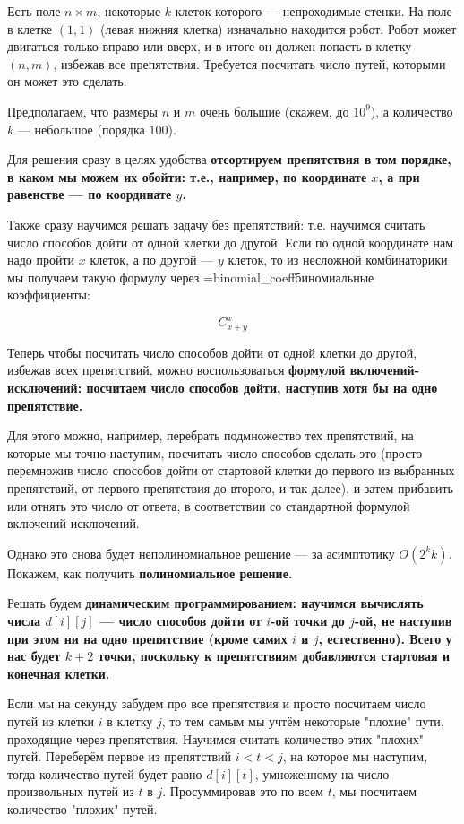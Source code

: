 Есть поле $n \times m$, некоторые $k$ клеток которого --- непроходимые стенки. На поле в клетке $(1,1)$ (левая нижняя клетка) изначально находится робот. Робот может двигаться только вправо или вверх, и в итоге он должен попасть в клетку $(n,m)$, избежав все препятствия. Требуется посчитать число путей, которыми он может это сделать.

Предполагаем, что размеры $n$ и $m$ очень большие (скажем, до $10^9$), а количество $k$ --- небольшое (порядка $100$).

Для решения сразу в целях удобства \bf{отсортируем} препятствия в том порядке, в каком мы можем их обойти: т.е., например, по координате $x$, а при равенстве --- по координате $y$.

Также сразу научимся решать задачу без препятствий: т.е. научимся считать число способов дойти от одной клетки до другой. Если по одной координате нам надо пройти $x$ клеток, а по другой --- $y$ клеток, то из несложной комбинаторики мы получаем такую формулу через \algohref=binomial_coeff{биномиальные коэффициенты}:

$$ C_{x+y}^{x} $$

Теперь чтобы посчитать число способов дойти от одной клетки до другой, избежав всех препятствий, можно воспользоваться \bf{формулой включений-исключений}: посчитаем число способов дойти, наступив хотя бы на одно препятствие.

Для этого можно, например, перебрать подмножество тех препятствий, на которые мы точно наступим, посчитать число способов сделать это (просто перемножив число способов дойти от стартовой клетки до первого из выбранных препятствий, от первого препятствия до второго, и так далее), и затем прибавить или отнять это число от ответа, в соответствии со стандартной формулой включений-исключений.

Однако это снова будет неполиномиальное решение --- за асимптотику $O (2^k k)$. Покажем, как получить \bf{полиномиальное решение}.

Решать будем \bf{динамическим программированием}: научимся вычислять числа $d[i][j]$ --- число способов дойти от $i$-ой точки до $j$-ой, не наступив при этом ни на одно препятствие (кроме самих $i$ и $j$, естественно). Всего у нас будет $k+2$ точки, поскольку к препятствиям добавляются стартовая и конечная клетки.

Если мы на секунду забудем про все препятствия и просто посчитаем число путей из клетки $i$ в клетку $j$, то тем самым мы учтём некоторые "плохие" пути, проходящие через препятствия. Научимся считать количество этих "плохих" путей. Переберём первое из препятствий $i < t < j$, на которое мы наступим, тогда количество путей будет равно $d[i][t]$, умноженному на число произвольных путей из $t$ в $j$. Просуммировав это по всем $t$, мы посчитаем количество "плохих" путей.

